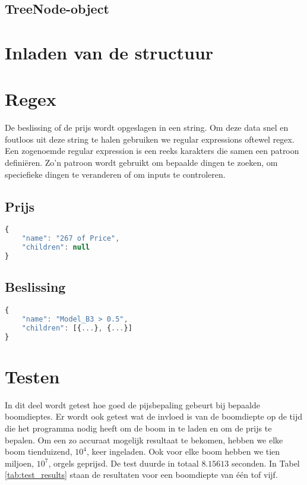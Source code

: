 \subsection{TreeNode-object}

\section{Inladen van de structuur}

\section{Regex}
De beslissing of de prijs wordt opgeslagen in een string. Om deze data snel en foutloos uit deze string te halen gebruiken we regular expressions oftewel regex. Een zogenoemde regular expression is een reeks karakters die samen een patroon definiëren. Zo'n patroon wordt gebruikt om bepaalde dingen te zoeken, om speciefieke dingen te veranderen of om inputs te controleren.\cite{wiki:regex}

\subsection{Prijs}
\begin{lstlisting}[language=JavaScript]
{
    "name": "267 of Price",
    "children": null
}
\end{lstlisting}
\subsection{Beslissing}

\begin{lstlisting}[language=JavaScript]
{
    "name": "Model_B3 > 0.5",
    "children": [{...}, {...}]
}
\end{lstlisting}

\section{Testen}
In dit deel wordt getest hoe goed de pijsbepaling gebeurt bij bepaalde boomdieptes. Er wordt ook getest wat de invloed is van de boomdiepte op de tijd die het programma nodig heeft om de boom in te laden en om de prijs te bepalen. Om een zo accuraat mogelijk resultaat te bekomen, hebben we elke boom tienduizend, \(10^4\), keer ingeladen. Ook voor elke boom hebben we tien miljoen, \(10^7\), orgels geprijsd. De test duurde in totaal \(8.15613\) seconden.
In Tabel \ref{tab:test_results} staan de resultaten voor een boomdiepte van één tof vijf.

